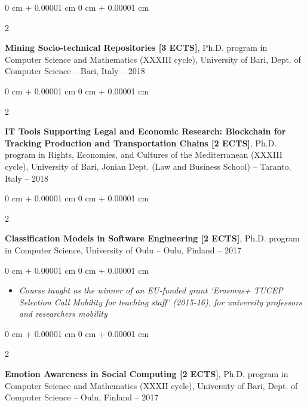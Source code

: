 \documentclass[10pt, a4paper]{article}
\newenvironment{highlights}{
    \begin{itemize}[
        topsep=0.10 cm,
        parsep=0.10 cm,
        partopsep=0pt,
        itemsep=0pt,
        leftmargin=0 cm + 10pt
    ]
}{
    \end{itemize}
} %
\newenvironment{onecolentry}{
    \begin{adjustwidth}{
        0 cm + 0.00001 cm
    }{
        0 cm + 0.00001 cm
    }
}{
    \end{adjustwidth}
} %
\newenvironment{twocolentry}[2][]{
    \onecolentry
    \def\secondColumn{#2}
    \setcolumnwidth{\fill, 4.5 cm}
    \begin{paracol}{2}
}{
    \switchcolumn \raggedleft \secondColumn
    \end{paracol}
    \endonecolentry
} %
\begin{document}
        \vspace{0.2 cm}

        \begin{twocolentry}{
            2017 – 2018
        }
            \textbf{Mining Socio-technical Repositories [3 ECTS]}, Ph.D. program in Computer Science and Mathematics (XXXIII cycle), University of Bari, Dept. of Computer Science -- Bari, Italy\end{twocolentry}



        \vspace{0.2 cm}

        \begin{twocolentry}{
            2017 – 2018
        }
            \textbf{IT Tools Supporting Legal and Economic Research: Blockchain for Tracking Production and Transportation Chains [2 ECTS]}, Ph.D. program in Rights, Economies, and Cultures of the Mediterranean (XXXIII cycle), University of Bari, Jonian Dept. (Law and Business School) -- Taranto, Italy\end{twocolentry}



        \vspace{0.2 cm}

        \begin{twocolentry}{
            2016 – 2017
        }
            \textbf{Classification Models in Software Engineering [2 ECTS]}, Ph.D. program in Computer Science, University of Oulu -- Oulu, Finland\end{twocolentry}

        \vspace{0.10 cm}
        \begin{onecolentry}
            \begin{highlights}
                \item \textit{Course taught as the winner of an EU-funded grant `Erasmus+ TUCEP Selection Call Mobility for teaching staff' (2015-16), for university professors and researchers mobility}
            \end{highlights}
        \end{onecolentry}


        \vspace{0.2 cm}

        \begin{twocolentry}{
            2016 – 2017
        }
            \textbf{Emotion Awareness in Social Computing [2 ECTS]}, Ph.D. program in Computer Science and Mathematics (XXXII cycle), University of Bari, Dept. of Computer Science -- Oulu, Finland\end{twocolentry}
\end{document}
